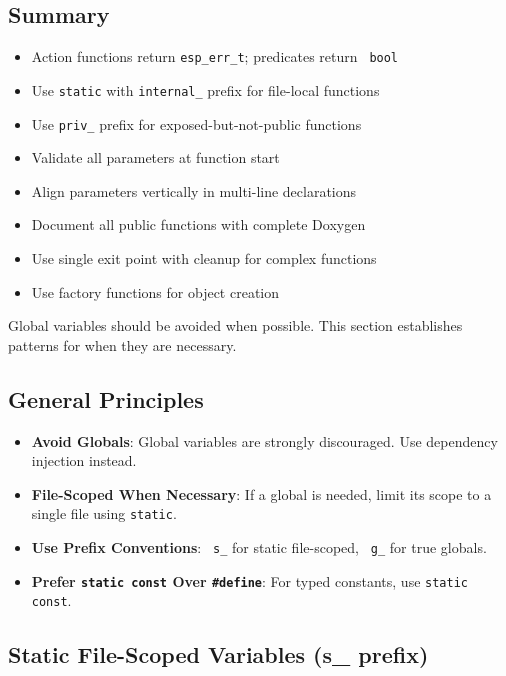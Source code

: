 \subsection{Summary}

\begin{itemize}
    \item Action functions return \texttt{esp\_err\_t}; predicates return \texttt{
      bool}
    \item Use \texttt{static} with \texttt{internal\_} prefix for file-local functions
    \item Use \texttt{priv\_} prefix for exposed-but-not-public functions
    \item Validate all parameters at function start
    \item Align parameters vertically in multi-line declarations
    \item Document all public functions with complete Doxygen
    \item Use single exit point with cleanup for complex functions
    \item Use factory functions for object creation
\end{itemize}



Global variables should be avoided when possible. This section establishes patterns for when they are necessary.

\subsection{General Principles}

\begin{itemize}
    \item \textbf{Avoid Globals}: Global variables are strongly discouraged. Use dependency injection instead.
    \item \textbf{File-Scoped When Necessary}: If a global is needed, limit its scope to a single file using \texttt{static}.
    \item \textbf{Use Prefix Conventions}: \texttt{
      s\_} for static file-scoped, \texttt{
      g\_} for true globals.
    \item \textbf{Prefer \texttt{static const} Over \texttt {\#define}}: For typed constants, use \texttt{static const}.
\end{itemize}

\subsection{Static File-Scoped Variables (s\_ prefix)}


